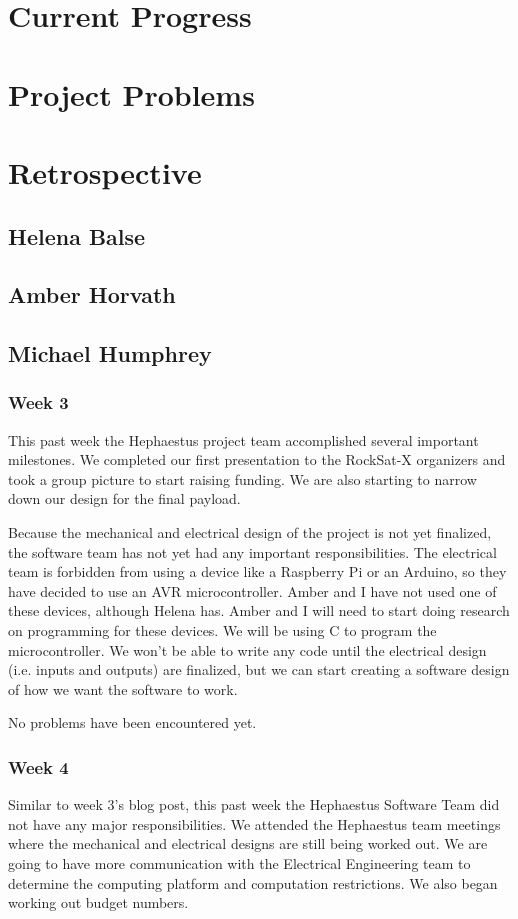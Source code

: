\documentclass[letterpaper,10pt]{article}
\begin{document}
\section{Current Progress}
\section{Project Problems}
\section{Retrospective}
\subsection{Helena Balse}
\subsection{Amber Horvath}
\subsection{Michael Humphrey}
\subsubsection{Week 3}
This past week the Hephaestus project team accomplished several important milestones. We completed our first presentation to the RockSat-X organizers and took a group picture to start raising funding. We are also starting to narrow down our design for the final payload.

Because the mechanical and electrical design of the project is not yet finalized, the software team has not yet had any important responsibilities. The electrical team is forbidden from using a device like a Raspberry Pi or an Arduino, so they have decided to use an AVR microcontroller. Amber and I have not used one of these devices, although Helena has. Amber and I will need to start doing research on programming for these devices. We will be using C to program the microcontroller. We won't be able to write any code until the electrical design (i.e. inputs and outputs) are finalized, but we can start creating a software design of how we want the software to work.

No problems have been encountered yet.

\subsubsection{Week 4}
Similar to week 3's blog post, this past week the Hephaestus Software Team did not have any major responsibilities. We attended the Hephaestus team meetings where the mechanical and electrical designs are still being worked out. We are going to have more communication with the Electrical Engineering team to determine the computing platform and computation restrictions. We also began working out budget numbers.
\end{document}
